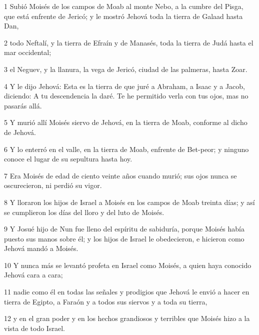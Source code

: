 \par 1 Subió Moisés de los campos de Moab al monte Nebo, a la cumbre del Pisga, que está enfrente de Jericó; y le mostró Jehová toda la tierra de Galaad hasta Dan,
\par 2 todo Neftalí, y la tierra de Efraín y de Manasés, toda la tierra de Judá hasta el mar occidental;
\par 3 el Neguev, y la llanura, la vega de Jericó, ciudad de las palmeras, hasta Zoar.
\par 4 Y le dijo Jehová: Esta es la tierra de que juré a Abraham, a Isaac y a Jacob, diciendo: A tu descendencia la daré. Te he permitido verla con tus ojos, mas no pasarás allá.
\par 5 Y murió allí Moisés siervo de Jehová, en la tierra de Moab, conforme al dicho de Jehová.
\par 6 Y lo enterró en el valle, en la tierra de Moab, enfrente de Bet-peor; y ninguno conoce el lugar de su sepultura hasta hoy.
\par 7 Era Moisés de edad de ciento veinte años cuando murió; sus ojos nunca se oscurecieron, ni perdió su vigor.
\par 8 Y lloraron los hijos de Israel a Moisés en los campos de Moab treinta días; y así se cumplieron los días del lloro y del luto de Moisés.
\par 9 Y Josué hijo de Nun fue lleno del espíritu de sabiduría, porque Moisés había puesto sus manos sobre él; y los hijos de Israel le obedecieron, e hicieron como Jehová mandó a Moisés.
\par 10 Y nunca más se levantó profeta en Israel como Moisés, a quien haya conocido Jehová cara a cara; 
\par 11 nadie como él en todas las señales y prodigios que Jehová le envió a hacer en tierra de Egipto, a Faraón y a todos sus siervos y a toda su tierra,
\par 12 y en el gran poder y en los hechos grandiosos y terribles que Moisés hizo a la vista de todo Israel.



